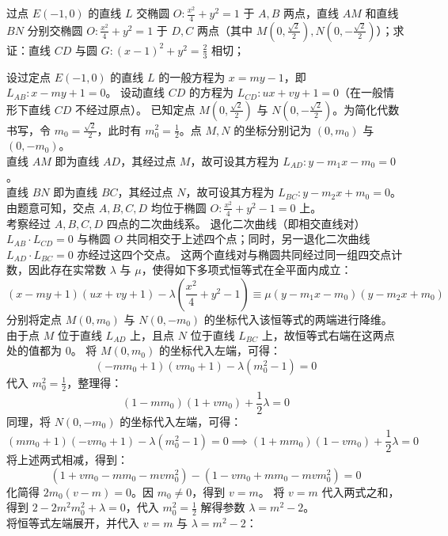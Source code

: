 \begin{example}
过点 \(E(-1,0)\) 的直线 \(L\) 交椭圆 \(O: \frac{x^2}{4} + y^2 = 1\) 于 \(A,B\) 两点，直线 \(AM\) 和直线 \(BN\) 分别交椭圆 \(O: \frac{x^2}{4} + y^2 = 1\) 于 \(D,C\) 两点（其中 \(M\left(0,\frac{\sqrt{2}}{2}\right),N\left(0,-\frac{\sqrt{2}}{2}\right)\)）；求证：直线 \(CD\) 与圆 \(G: (x - 1)^2 + y^2 = \frac{2}{3}\) 相切；
\end{example}
\begin{solution}
设过定点 $E(-1,0)$ 的直线 $L$ 的一般方程为 $x = my - 1$，即 $L_{AB}: x - my + 1 = 0$。
设动直线 $CD$ 的方程为 $L_{CD}: ux + vy + 1 = 0$（在一般情形下直线 $CD$ 不经过原点）。
已知定点 $M\left(0, \frac{\sqrt{2}}{2}\right)$ 与 $N\left(0, -\frac{\sqrt{2}}{2}\right)$。为简化代数书写，令 $m_0 = \frac{\sqrt{2}}{2}$，此时有 $m_0^2 = \frac{1}{2}$。点 $M, N$ 的坐标分别记为 $(0, m_0)$ 与 $(0, -m_0)$。\\
直线 $AM$ 即为直线 $AD$，其经过点 $M$，故可设其方程为 $L_{AD}: y - m_1 x - m_0 = 0$。\\
直线 $BN$ 即为直线 $BC$，其经过点 $N$，故可设其方程为 $L_{BC}: y - m_2 x + m_0 = 0$。\\
由题意可知，交点 $A, B, C, D$ 均位于椭圆 $O: \frac{x^2}{4} + y^2 - 1 = 0$ 上。\\
考察经过 $A, B, C, D$ 四点的二次曲线系。
退化二次曲线（即相交直线对） $L_{AB} \cdot L_{CD} = 0$ 与椭圆 $O$ 共同相交于上述四个点；同时，另一退化二次曲线 $L_{AD} \cdot L_{BC} = 0$ 亦经过这四个交点。
这两个直线对与椭圆共同经过同一组四交点计数，因此存在实常数 $\lambda$ 与 $\mu$，使得如下多项式恒等式在全平面内成立：
$$ (x - my + 1)(ux + vy + 1) - \lambda\left(\frac{x^2}{4} + y^2 - 1\right) \equiv \mu(y - m_1 x - m_0)(y - m_2 x + m_0) $$
分别将定点 $M(0, m_0)$ 与 $N(0, -m_0)$ 的坐标代入该恒等式的两端进行降维。
由于点 $M$ 位于直线 $L_{AD}$ 上，且点 $N$ 位于直线 $L_{BC}$ 上，故恒等式右端在这两点处的值都为 $0$。
将 $M(0, m_0)$ 的坐标代入左端，可得：
$$ (-m m_0 + 1)(v m_0 + 1) - \lambda(m_0^2 - 1) = 0 $$
代入 $m_0^2 = \frac{1}{2}$，整理得：
$$ (1 - m m_0)(1 + v m_0) + \frac{1}{2}\lambda = 0 $$
同理，将 $N(0, -m_0)$ 的坐标代入左端，可得：
$$ (m m_0 + 1)(-v m_0 + 1) - \lambda(m_0^2 - 1) = 0 \implies (1 + m m_0)(1 - v m_0) + \frac{1}{2}\lambda = 0 $$
将上述两式相减，得到：
$$ (1 + v m_0 - m m_0 - m v m_0^2) - (1 - v m_0 + m m_0 - m v m_0^2) = 0 $$
化简得 $2m_0(v - m) = 0$。因 $m_0 \neq 0$，得到 $v = m$。
将 $v = m$ 代入两式之和，得到 $2 - 2m^2 m_0^2 + \lambda = 0$，代入 $m_0^2 = \frac{1}{2}$ 解得参数 $\lambda = m^2 - 2$。\\
将恒等式左端展开，并代入 $v = m$ 与 $\lambda = m^2 - 2$：

\end{solution}
